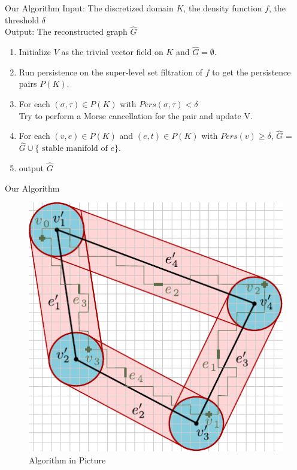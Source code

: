\documentclass[9pt,sans-serif]{beamer}
\begin{document}
\begin{frame}{Our Algorithm}
  Input: The discretized domain $K$, the density function $f$, the threshold
  $\delta$ \\
  Output: The reconstructed graph $\hat G$

  \pause
  
  \begin{enumerate}
  \item Initialize $V$ as the trivial vector field on $K$ and $\hat{G}=\emptyset$.

    \pause
    
  \item Run persistence on the super-level set filtration of $f$ to get the
    persistence pairs $P(K)$.

    \pause
    
  \item For each $(\sigma,\tau)\in P(K)$ with $Pers(\sigma,\tau)<\delta$ \\ Try
    to perform a Morse cancellation for the pair and update V.

    \pause
  \item For each $(v,e)\in P(K)$ and $(e,t)\in P(K)$ with $Pers(v)\geq\delta$,
    $\hat G$ = $\hat G\cup\{\text{ stable manifold of } e\}$.

    \pause
  \item   output $\hat G$
  \end{enumerate}    
\end{frame}


\begin{frame}{Our Algorithm}
  \begin{figure}[htb]
    \centering \includegraphics[scale=1]{cycle}
    \caption{Algorithm in Picture}
  \end{figure}
  
\end{frame}
\end{document}
